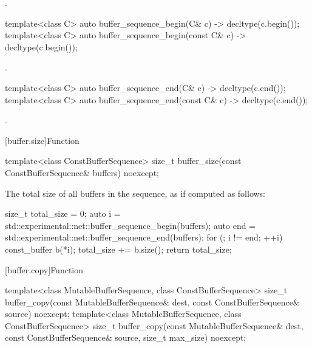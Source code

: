 \begin{itemdescr}
\pnum
\returns {}.
\end{itemdescr}

%
\begin{itemdecl}
template<class C> auto buffer_sequence_begin(C& c) -> decltype(c.begin());
template<class C> auto buffer_sequence_begin(const C& c) -> decltype(c.begin());
\end{itemdecl}

\begin{itemdescr}
\pnum
\returns {}.
\end{itemdescr}

%
\begin{itemdecl}
template<class C> auto buffer_sequence_end(C& c) -> decltype(c.end());
template<class C> auto buffer_sequence_end(const C& c) -> decltype(c.end());
\end{itemdecl}

\begin{itemdescr}
\pnum
\returns {}.
\end{itemdescr}



[buffer.size]{Function }

%
\begin{itemdecl}
template<class ConstBufferSequence>
  size_t buffer_size(const ConstBufferSequence& buffers) noexcept;
\end{itemdecl}

\begin{itemdescr}
\pnum
\returns The total size of all buffers in the sequence, as if computed as follows:
\begin{codeblock}
size_t total_size = 0;
auto i = std::experimental::net::buffer_sequence_begin(buffers);
auto end = std::experimental::net::buffer_sequence_end(buffers);
for (; i != end; ++i)
{
  const_buffer b(*i);
  total_size += b.size();
}
return total_size;
\end{codeblock}

\end{itemdescr}



[buffer.copy]{Function }

%
\begin{itemdecl}
template<class MutableBufferSequence, class ConstBufferSequence>
  size_t buffer_copy(const MutableBufferSequence& dest,
                     const ConstBufferSequence& source) noexcept;
template<class MutableBufferSequence, class ConstBufferSequence>
  size_t buffer_copy(const MutableBufferSequence& dest,
                     const ConstBufferSequence& source,
                     size_t max_size) noexcept;
\end{itemdecl}

